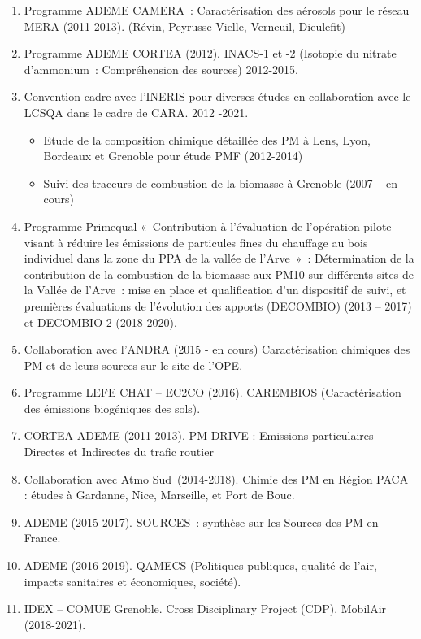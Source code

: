 \documentclass[a4paper,11pt]{book}
\begin{document}
\begin{enumerate}
    \item Programme ADEME CAMERA : Caractérisation des aérosols pour le réseau MERA (2011-2013). (Révin, Peyrusse-Vielle, Verneuil, Dieulefit)
    \item Programme ADEME CORTEA (2012). INACS-1 et -2 (Isotopie du nitrate d’ammonium : Compréhension des sources) 2012-2015. 
    \item Convention cadre avec l’INERIS pour diverses études en collaboration avec le LCSQA dans le cadre de CARA. 2012 -2021. 
        \begin{itemize}
            \item Etude de la composition chimique détaillée des PM à Lens, Lyon, Bordeaux et Grenoble pour étude PMF (2012-2014) 
            \item Suivi des traceurs de combustion de la biomasse à Grenoble (2007 – en cours) 
        \end{itemize}
    \item Programme Primequal « Contribution à l’évaluation de l’opération pilote visant à réduire les émissions de particules fines du chauffage au bois individuel dans la zone du PPA de la vallée de l'Arve » : Détermination de la contribution de la combustion de la biomasse aux PM10 sur différents sites de la Vallée de l’Arve : mise en place et qualification d’un dispositif de suivi, et premières évaluations de l’évolution des apports (DECOMBIO) (2013 – 2017) et DECOMBIO 2 (2018-2020). 
    \item Collaboration avec l’ANDRA (2015 - en cours) Caractérisation chimiques des PM et de leurs sources sur le site de l’OPE. 
    \item Programme LEFE CHAT – EC2CO (2016). CAREMBIOS (Caractérisation des émissions biogéniques des sols). 
    \item CORTEA ADEME (2011-2013). PM-DRIVE : Emissions particulaires Directes et Indirectes du trafic routier 
    \item Collaboration avec Atmo Sud (2014-2018). Chimie des PM en Région PACA : études à Gardanne, Nice, Marseille, et Port de Bouc. 
    \item ADEME (2015-2017). SOURCES : synthèse sur les Sources des PM en France. 
    \item ADEME (2016-2019). QAMECS (Politiques publiques, qualité de l’air, impacts sanitaires et économiques, société). 
    \item IDEX – COMUE Grenoble. Cross Disciplinary Project (CDP). MobilAir (2018-2021).

\end{enumerate}
\end{document}
